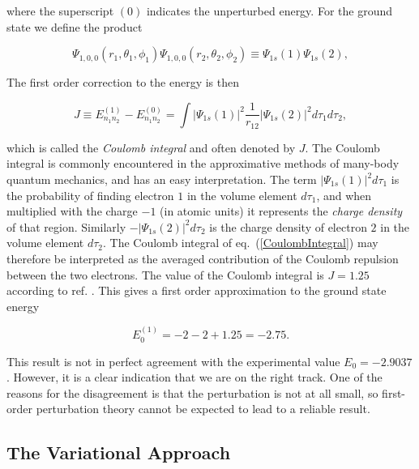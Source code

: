 where the superscript ${(0)}$ indicates the unperturbed energy. For
the ground state we define the product   

\begin{equation*}
  \Psi_{1,0,0}(r_1, \theta_1, \phi_1) 
  \Psi_{1,0,0}(r_2, \theta_2, \phi_2) 
  \equiv \Psi_{1s}(1) \Psi_{1s}(2),
\end{equation*}

The first order correction to the energy is then

\begin{equation}
  J \equiv E_{n_1n_2}^{(1)} - E_{n_1n_2}^{(0)} 
  = \int |\Psi_{1s}(1)|^2 \frac{1}{r_{12}}
  |\Psi_{1s}(2)|^2 d\tau_1 d\tau_2 ,
\label{CoulombIntegral}
\end{equation}

which is called the \emph{Coulomb integral} and often denoted by
$J$. The Coulomb integral is commonly encountered in the approximative 
methods of many-body quantum mechanics, and has an easy
interpretation. The term $|\Psi_{1s}(1)|^2 d\tau_1$ is the probability
of finding electron $1$ in the volume element $d\tau_1$, and when
multiplied with the charge $-1$ (in atomic units) it represents the
\emph{charge density} of that region. Similarly $-|\Psi_{1s}(2)|^2
d\tau_2$ is the charge density of electron $2$ in the volume element
$d\tau_2$. The Coulomb integral of eq.~(\ref{CoulombIntegral}) may
therefore be interpreted as the averaged contribution of the Coulomb
repulsion between the two electrons. The value of the Coulomb integral
is $J = 1.25$ according to ref. \cite{atkins2003}. This gives a first
order approximation to the ground state energy

\begin{equation*}
  E_0^{(1)} = - 2 - 2 + 1.25 = - 2.75.
\end{equation*}

This result is not in perfect agreement with the experimental value
$E_0=-2.9037$. However, it is a clear indication that we are on the
right track. One of the reasons for the disagreement is that the
perturbation is not at all small, so first-order perturbation theory
cannot be expected to lead to a reliable result.


\subsection{The Variational Approach}

